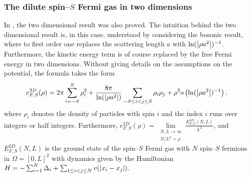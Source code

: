 \subsubsection{The dilute spin--$ S $ Fermi gas in two dimensions}
In \cite{lieb2005ground}, the two dimensional result was also proved. The intuition behind the two dimensional result is, in this case, understood by considering the bosonic result, where to first order one replaces the scattering length $ a $ with $ \ln(\left\lvert \rho a^2 \right\rvert)^{-1} $. Furthermore, the kinetic energy term is of course replaced by the free Fermi energy in two dimensions. Without giving details on the assumptions on the potential, the formula takes the form
\begin{equation}
e^{2D}_{F,S}(\rho)=2\pi \sum_{i=-S}^{S}\rho_i^{2}+\frac{8\pi}{\ln(\left\lvert \rho a^2 \right\rvert)} \sum_{-S\leq i<j\leq S}\rho_i\rho_j+\rho^2 o\left(\ln(\left\lvert \rho a^2 \right\rvert)^{-1}\right).
\end{equation}
where $ \rho_i $ denotes the density of particles with spin $ i $ and the index $ i $ runs over integers or half integers. Furthermore, $ e^{2D}_{F,S}(\rho)=\lim\limits_{\substack{N,L\to\infty\\ N/L^2=\rho}}\frac{E^{2D}_{F,S}(N,L)}{L^2} $, and $ E^{2D}_{F,S}(N,L) $ is the ground state of the spin--$ S $ Fermi gas with $ N $ spin--$ S $ fermions in $ \Omega=[0,L]^2 $ with dynamics given by the Hamiltonian $ H=-\sum_{i=1}^{N}\Delta_i+\sum_{1\leq i<j\leq N} v(\left\lvert x_i-x_j \right\rvert) $.\\


